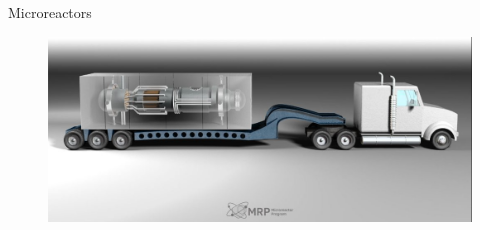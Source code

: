 \documentclass[9pt,t,aspectratio=169]{beamer}
\begin{document}
\begin{frame}{Microreactors \cite{INL_MR}}
    \begin{figure}
        \centering
        \includegraphics[width=0.95\linewidth]{figures/INL_MR.png}
    \end{figure}
\end{frame}
\hypersetup{citecolor=black}
\end{document}
